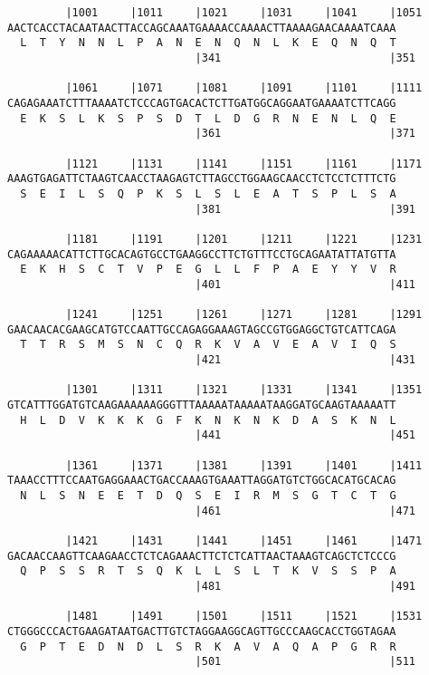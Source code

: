 \documentclass{article}
\begin{document}
\begin{Verbatim}
         |1001     |1011     |1021     |1031     |1041     |1051
AACTCACCTACAATAACTTACCAGCAAATGAAAACCAAAACTTAAAAGAACAAAATCAAA
  L  T  Y  N  N  L  P  A  N  E  N  Q  N  L  K  E  Q  N  Q  T
                             |341                          |351
  
         |1061     |1071     |1081     |1091     |1101     |1111
CAGAGAAATCTTTAAAATCTCCCAGTGACACTCTTGATGGCAGGAATGAAAATCTTCAGG
  E  K  S  L  K  S  P  S  D  T  L  D  G  R  N  E  N  L  Q  E
                             |361                          |371
  
         |1121     |1131     |1141     |1151     |1161     |1171
AAAGTGAGATTCTAAGTCAACCTAAGAGTCTTAGCCTGGAAGCAACCTCTCCTCTTTCTG
  S  E  I  L  S  Q  P  K  S  L  S  L  E  A  T  S  P  L  S  A
                             |381                          |391
  
         |1181     |1191     |1201     |1211     |1221     |1231
CAGAAAAACATTCTTGCACAGTGCCTGAAGGCCTTCTGTTTCCTGCAGAATATTATGTTA
  E  K  H  S  C  T  V  P  E  G  L  L  F  P  A  E  Y  Y  V  R
                             |401                          |411
  
         |1241     |1251     |1261     |1271     |1281     |1291
GAACAACACGAAGCATGTCCAATTGCCAGAGGAAAGTAGCCGTGGAGGCTGTCATTCAGA
  T  T  R  S  M  S  N  C  Q  R  K  V  A  V  E  A  V  I  Q  S
                             |421                          |431
  
         |1301     |1311     |1321     |1331     |1341     |1351
GTCATTTGGATGTCAAGAAAAAAGGGTTTAAAAATAAAAATAAGGATGCAAGTAAAAATT
  H  L  D  V  K  K  K  G  F  K  N  K  N  K  D  A  S  K  N  L
                             |441                          |451
  
         |1361     |1371     |1381     |1391     |1401     |1411
TAAACCTTTCCAATGAGGAAACTGACCAAAGTGAAATTAGGATGTCTGGCACATGCACAG
  N  L  S  N  E  E  T  D  Q  S  E  I  R  M  S  G  T  C  T  G
                             |461                          |471
  
         |1421     |1431     |1441     |1451     |1461     |1471
GACAACCAAGTTCAAGAACCTCTCAGAAACTTCTCTCATTAACTAAAGTCAGCTCTCCCG
  Q  P  S  S  R  T  S  Q  K  L  L  S  L  T  K  V  S  S  P  A
                             |481                          |491
  
         |1481     |1491     |1501     |1511     |1521     |1531
CTGGGCCCACTGAAGATAATGACTTGTCTAGGAAGGCAGTTGCCCAAGCACCTGGTAGAA
  G  P  T  E  D  N  D  L  S  R  K  A  V  A  Q  A  P  G  R  R
                             |501                          |511
  

\end{Verbatim}
\end{document}
